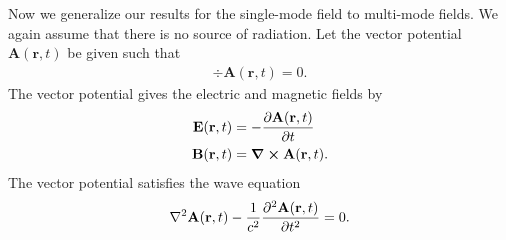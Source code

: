\documentclass{book}
\theoremstyle{definition}
\newcommand{\p}{\partial}
\newcommand{\f}[2]{\frac{#1}{#2}}
\begin{document}
Now we generalize our results for the single-mode field to multi-mode fields. We again assume that there is no source of radiation. Let the vector potential $\mathbf{A}(\mathbf{r},t)$ be given such that
\begin{align}\label{gauge}
\div{\mathbf{A}(\mathbf{r},t)} = 0.
\end{align}
The vector potential gives the electric and magnetic fields by
\begin{align}\label{EB}
\mathbf{E}(\mathbf{r},t) &= -\f{\p \mathbf{A}(\mathbf{r},t)}{\p t}\\
\mathbf{B}(\mathbf{r},t) &= \curl{\mathbf{A}(\mathbf{r},t)}.
\end{align}
The vector potential satisfies the wave equation
\begin{align}\label{waves}
\laplacian{\mathbf{A}(\mathbf{r},t)} - \f{1}{c^2}\f{\p^2 \mathbf{A}(\mathbf{r},t)}{\p t^2} = 0.
\end{align}
\end{document}

